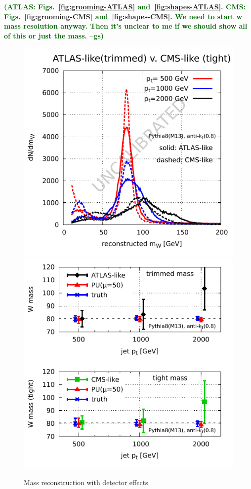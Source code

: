 \documentclass[11pt,letterpaper]{article}
\newcommand{\gs}[1]{\textbf{\textcolor{darkgreen}{(#1 --gs)}}}
\begin{document}
\gs{ATLAS: Figs.~\ref{fig:grooming-ATLAS}
  and~\ref{fig:shapes-ATLAS}. CMS: Figs.~\ref{fig:grooming-CMS}
  and~\ref{fig:shapes-CMS}. We need to start w mass resolution
  anyway. Then it's unclear to me if we should show all of this or
  just the mass.}


\begin{figure}
  \includegraphics[width=0.45\columnwidth]{figures/mass-detector.pdf}
  \hfill
  \includegraphics[width=0.45\columnwidth]{figures/mass-width-detector.pdf}
  \caption{Mass reconstruction with detector effects}
  \label{fig:mass-detector}
\end{figure}
\end{document}
